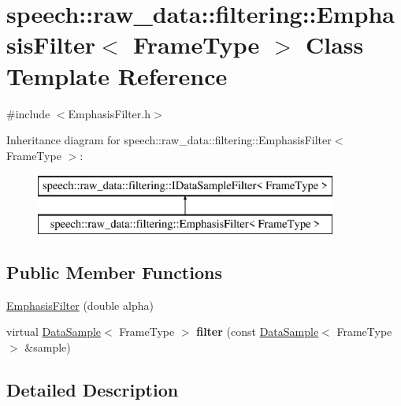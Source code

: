 \hypertarget{classspeech_1_1raw__data_1_1filtering_1_1EmphasisFilter}{\section{speech\+:\+:raw\+\_\+data\+:\+:filtering\+:\+:Emphasis\+Filter$<$ Frame\+Type $>$ Class Template Reference}
\label{classspeech_1_1raw__data_1_1filtering_1_1EmphasisFilter}
}


{\ttfamily \#include $<$Emphasis\+Filter.\+h$>$}

Inheritance diagram for speech\+:\+:raw\+\_\+data\+:\+:filtering\+:\+:Emphasis\+Filter$<$ Frame\+Type $>$\+:\begin{figure}[H]
\begin{center}
\leavevmode
\includegraphics[height=2.000000cm]{classspeech_1_1raw__data_1_1filtering_1_1EmphasisFilter}
\end{center}
\end{figure}
\subsection*{Public Member Functions}
\begin{DoxyCompactItemize}
\item 
\hyperlink{classspeech_1_1raw__data_1_1filtering_1_1EmphasisFilter_a128b508047206178272d05d8e834bbef}{Emphasis\+Filter} (double alpha)
\item 
\hypertarget{classspeech_1_1raw__data_1_1filtering_1_1EmphasisFilter_a822e28df9a52d5dea97a1f27eabfd7d1}{virtual \hyperlink{classspeech_1_1raw__data_1_1DataSample}{Data\+Sample}$<$ Frame\+Type $>$ {\bfseries filter} (const \hyperlink{classspeech_1_1raw__data_1_1DataSample}{Data\+Sample}$<$ Frame\+Type $>$ \&sample)}\label{classspeech_1_1raw__data_1_1filtering_1_1EmphasisFilter_a822e28df9a52d5dea97a1f27eabfd7d1}

\end{DoxyCompactItemize}


\subsection{Detailed Description}
